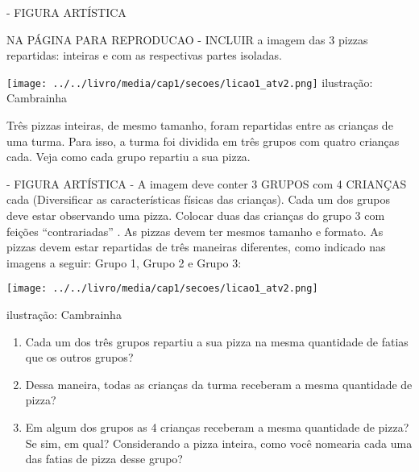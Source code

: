 \documentclass[a4paper,12pt,twoside]{book}
\begin{document}
\begin{professor*}[breakable]{}{}
  
  \begin{imagem*}[breakable]{}{}      - FIGURA ARTÍSTICA     
    \begin{nota*}[breakable]{}{}       NA PÁGINA PARA REPRODUCAO - INCLUIR a imagem das 3 pizzas repartidas: inteiras e com as respectivas partes isoladas.      
    \end{nota*}    
    
        \texttt{[image: ../../livro/media/cap1/secoes/licao1\_atv2.png]}    
    ilustração: Cambrainha    
    
  \end{imagem*}  
\end{professor*}


Três pizzas inteiras, de mesmo tamanho, foram repartidas entre as crianças de uma turma. Para isso, a turma foi dividida em três grupos com quatro crianças cada. Veja como cada grupo repartiu a sua pizza.

\begin{imagem*}[breakable]{}{}    - FIGURA ARTÍSTICA - A imagem deve conter 3 GRUPOS com 4 CRIANÇAS cada (Diversificar as características físicas das crianças). Cada um dos grupos deve estar observando uma pizza. Colocar duas das crianças do grupo 3 com feições   ``contrariadas''  . As pizzas devem ter mesmos tamanho e formato. As pizzas devem estar repartidas de três maneiras diferentes, como indicado nas imagens a seguir: Grupo 1, Grupo 2 e Grupo 3:   
  
    \texttt{[image: ../../livro/media/cap1/secoes/licao1\_atv2.png]}  
  
  ilustração: Cambrainha  
  
\end{imagem*}

\begin{enumerate} [\quad I)] %
  \item     Cada um dos três grupos repartiu a sua pizza na mesma quantidade de fatias que os outros grupos?
  \item     Dessa maneira, todas as crianças da turma receberam a mesma quantidade de pizza?
  \item     Em algum dos grupos as 4 crianças receberam a mesma quantidade de pizza? Se sim, em qual? Considerando a pizza inteira, como você nomearia cada uma das fatias de pizza desse grupo? 
\end{enumerate} %
\end{document}
